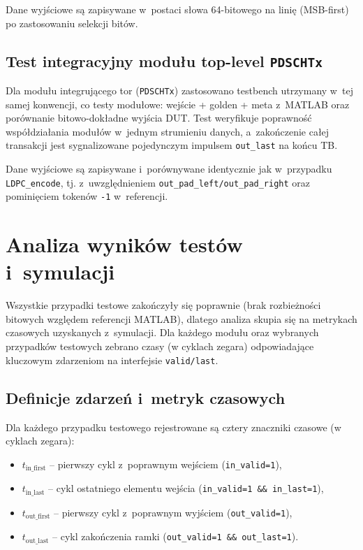 Dane wyjściowe są zapisywane w~postaci słowa 64-bitowego na linię (MSB-first) po zastosowaniu selekcji bitów.

\subsection{Test integracyjny modułu top-level \texttt{PDSCHTx}}
\label{subsec:tb_pdschtx}

Dla modułu integrującego tor (\texttt{PDSCHTx}) zastosowano testbench utrzymany w~tej samej konwencji,
co testy modułowe: wejście + golden + meta z~MATLAB oraz porównanie bitowo-dokładne wyjścia DUT.
Test weryfikuje poprawność współdziałania modułów w~jednym strumieniu danych, a~zakończenie całej transakcji
jest sygnalizowane pojedynczym impulsem \texttt{out\_last} na końcu TB.

Dane wyjściowe są zapisywane i~porównywane identycznie jak w~przypadku \texttt{LDPC\_encode},
tj. z~uwzględnieniem \texttt{out\_pad\_left/out\_pad\_right} oraz pominięciem tokenów \texttt{-1} w~referencji.




\section{Analiza wyników testów i~symulacji}
\label{sec:analiza_symulacji}

Wszystkie przypadki testowe zakończyły się poprawnie (brak rozbieżności bitowych względem referencji MATLAB),
dlatego analiza skupia się na metrykach czasowych uzyskanych z~symulacji. Dla każdego modułu oraz wybranych
przypadków testowych zebrano czasy (w cyklach zegara) odpowiadające kluczowym zdarzeniom na interfejsie
\texttt{valid/last}.

\subsection{Definicje zdarzeń i~metryk czasowych}
\label{subsec:latency_definitions}

Dla każdego przypadku testowego rejestrowane są cztery znaczniki czasowe (w cyklach zegara):
\begin{itemize}
    \item $t_{\mathrm{in\_first}}$ -- pierwszy cykl z~poprawnym wejściem (\texttt{in\_valid=1}),
    \item $t_{\mathrm{in\_last}}$  -- cykl ostatniego elementu wejścia (\texttt{in\_valid=1 \&\& in\_last=1}),
    \item $t_{\mathrm{out\_first}}$ -- pierwszy cykl z~poprawnym wyjściem (\texttt{out\_valid=1}),
    \item $t_{\mathrm{out\_last}}$  -- cykl zakończenia ramki (\texttt{out\_valid=1 \&\& out\_last=1}).
\end{itemize}


